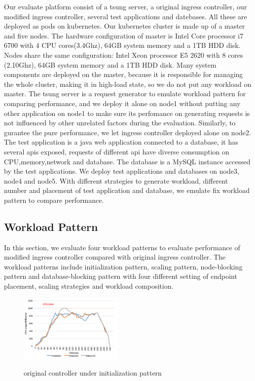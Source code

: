 Our evaluate platform consist of a tsung server, a original ingress controller, our modified ingress controller, several test applications and datebases.
All these are deployed as pods on kubernetes. Our kubernetes cluster is made up of a master and five nodes. The hardware configuration of master is Intel Core processor i7 6700 with 4 CPU cores(3.4Ghz), 64GB system memory and
a 1TB HDD disk. Nodes share the same configuration: Intel Xeon processor E5 2620 with 8 cores (2.10Ghz), 64GB system memory and a 1TB HDD disk. Many system components are deployed on the master, because it is responsible for managing the whole cluster, making it in high-load state, so we do not put any workload on master.
The tsung server is a request generator to emulate workload pattern for comparing performance, and we deploy it alone on node1 without putting any other application on node1 to make sure its perfomance on generating requests is not influenced by other unrelated factors during the evaluation.
Similarly, to gurantee the pure performance, we let ingress controller deployed alone on node2. The test application is a java web application connected to a database, it has several apis exposed, requests of different api have diverse consumption on CPU,memory,network and database.
The database is a MySQL instance accessed by the test applications. We deploy test applications and databases on node3, node4 and node5. With different strategies to generate workload, different number and placement of test application and database, we emulate fix workload pattern to
compare performance.

\subsection{Workload Pattern}
\label{subsec:workload_pattern}
In this section, we evaluate four workload patterns to evaluate performance of modified ingress controller compared with original ingress controller.
The workload patterns include initialization pattern, scaling pattern, node-blocking pattern and database-blocking pattern with four different setting of
endpoint placement, scaling strategies and workload composition.
\begin{figure}[!htb]
  \centering
  \includegraphics[width=0.45\textwidth]{images/data1.png}\\
  \caption{original controller under initialization pattern}
  \label{fig:original_initialization}
\end{figure}

